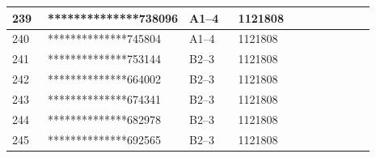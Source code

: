 \documentclass[UTF8,10pt,a4paper,fontset=fandol]{ctexart}
\newcommand{\fieldvalue}[1]{#1}
\begin{document}
\begin{center}
\begin{tabular}{|p{0.10\linewidth}|p{0.25\linewidth}|p{0.14\linewidth}|p{0.24\linewidth}|p{0.16\linewidth}|}
\fieldvalue{239} &
\fieldvalue{**************738096} &
\fieldvalue{A1--4} &
\fieldvalue{1121808} & \\ \hline

\fieldvalue{240} &
\fieldvalue{**************745804} &
\fieldvalue{A1--4} &
\fieldvalue{1121808} & \\ \hline

\fieldvalue{241} &
\fieldvalue{**************753144} &
\fieldvalue{B2--3} &
\fieldvalue{1121808} & \\ \hline

\fieldvalue{242} &
\fieldvalue{**************664002} &
\fieldvalue{B2--3} &
\fieldvalue{1121808} & \\ \hline

\fieldvalue{243} &
\fieldvalue{**************674341} &
\fieldvalue{B2--3} &
\fieldvalue{1121808} & \\ \hline

\fieldvalue{244} &
\fieldvalue{**************682978} &
\fieldvalue{B2--3} &
\fieldvalue{1121808} & \\ \hline

\fieldvalue{245} &
\fieldvalue{**************692565} &
\fieldvalue{B2--3} &
\fieldvalue{1121808} & \\ \hline


\end{tabular}
\end{center}
\end{document}
